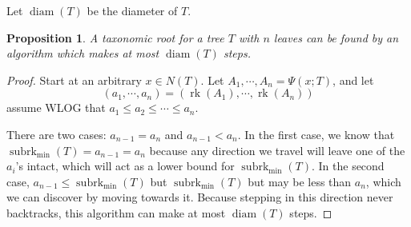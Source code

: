 \documentclass{amsart}
\newcommand{\treecut}{\Psi}
\newcommand{\rk}{\operatorname{rk}}
\newcommand{\subrk}{\operatorname{subrk}}
\newcommand{\minsubrk}{\subrk_{\min}}
\newcommand{\diam}{\operatorname{diam}}
\newtheorem{prop}{Proposition}
\begin{document}
Let $\diam(T)$ be the diameter of $T$.

\begin{prop}
A taxonomic root for a tree $T$ with $n$ leaves can be found by an algorithm which makes at most $\diam(T)$ steps.
\end{prop}

\begin{proof}
  Start at an arbitrary $x \in N(T)$.
  Let ${A_1,\cdots,A_n} = \treecut(x;T)$, and let
  \[
    (a_1,\cdots,a_n) = (\rk(A_1), \cdots, \rk(A_n))
  \]
  assume WLOG that $a_1 \leq a_2 \leq \cdots \leq a_n$.

  There are two cases: $a_{n-1} = a_n$ and $a_{n-1} < a_n$.
  In the first case, we know that $\minsubrk(T) = a_{n-1} = a_n$ because any direction we travel will leave one of the $a_i$'s intact, which will act as a lower bound for $\minsubrk(T)$.
  In the second case, $a_{n-1} \leq \minsubrk(T)$ but $\minsubrk(T)$ but may be less than $a_n$, which we can discover by moving towards it.
  Because stepping in this direction never backtracks, this algorithm can make at most $\diam(T)$ steps.
\end{proof}



\end{document}

